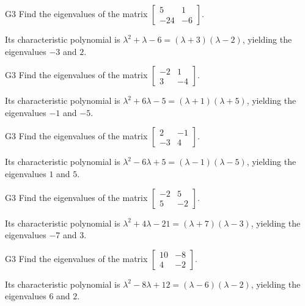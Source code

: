 \begin{problem}{G3}
Find the eigenvalues of the matrix \(\begin{bmatrix} 5 & 1 \\ -24 & -6\end{bmatrix}\).
\end{problem}
\begin{solution}
Its characteristic polynomial is \(\lambda^2+\lambda-6=(\lambda+3)(\lambda-2)\), yielding the eigenvalues \(-3\) and \(2\).
\end{solution}

\begin{problem}{G3}
Find the eigenvalues of the matrix \(\begin{bmatrix} -2 & 1 \\ 3 & -4\end{bmatrix}\).
\end{problem}
\begin{solution}
Its characteristic polynomial is \(\lambda^2+6\lambda-5=(\lambda+1)(\lambda+5)\), yielding the eigenvalues \(-1\) and \(-5\).
\end{solution}

\begin{problem}{G3}
Find the eigenvalues of the matrix \(\begin{bmatrix} 2 & -1 \\ -3 & 4\end{bmatrix}\).
\end{problem}
\begin{solution}
Its characteristic polynomial is \(\lambda^2-6\lambda+5=(\lambda-1)(\lambda-5)\), yielding the eigenvalues \(1\) and \(5\).
\end{solution}

\begin{problem}{G3}
Find the eigenvalues of the matrix \(\begin{bmatrix} -2 & 5 \\ 5 & -2\end{bmatrix}\).
\end{problem}
\begin{solution}
Its characteristic polynomial is \(\lambda^2+4\lambda-21=(\lambda+7)(\lambda-3)\), yielding the eigenvalues \(-7\) and \(3\).
\end{solution}

\begin{problem}{G3}
Find the eigenvalues of the matrix \(\begin{bmatrix} 10 & -8 \\ 4 & -2\end{bmatrix}\).
\end{problem}
\begin{solution}
Its characteristic polynomial is \(\lambda^2-8\lambda+12=(\lambda-6)(\lambda-2)\), yielding the eigenvalues \(6\) and \(2\).
\end{solution}

